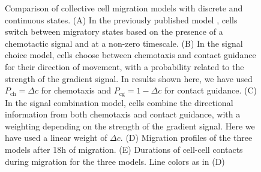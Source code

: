 \documentclass[review]{elsarticle}
\begin{document}
\begin{figure}
\caption{Comparison of collective cell migration models with discrete and continuous states. (A) In the previously published model \cite{McLennan2015b}, cells switch between migratory states based on the presence of a chemotactic signal and at a non-zero timescale. (B) In the signal choice model, cells choose between chemotaxis and contact guidance for their direction of movement, with a probability related to the strength of the gradient signal. In results shown here, we have used $P_\mathrm{ch}=\Delta c$ for chemotaxis and $P_\mathrm{cg}=1 - \Delta c$ for contact guidance. (C) In the signal combination model, cells combine the directional information from both chemotaxis and contact guidance, with a weighting depending on the strength of the gradient signal. Here we have used a linear weight of $\Delta c$. (D) Migration profiles of the three models after 18h of migration. (E) Durations of cell-cell contacts during migration for the three models. Line colors as in (D) \label{figNaiveModel}}
\end{figure}
\end{document}
